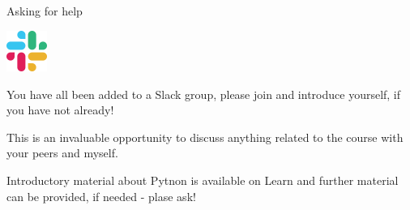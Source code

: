 \documentclass[9pt, aspectratio=169]{beamer}
\begin{document}
\begin{frame}
    {Asking for help}
    \begin{center}
        \includegraphics[width=0.1\textwidth]{slack.png}
    \end{center}

    You have all been added to a Slack group, please join and introduce yourself, if you have not already!

    This is an invaluable opportunity to discuss anything related to the course with your peers and myself.

    Introductory material about Pytnon is available on Learn and further material can be provided, if needed - plase ask!
\end{frame}
\end{document}
